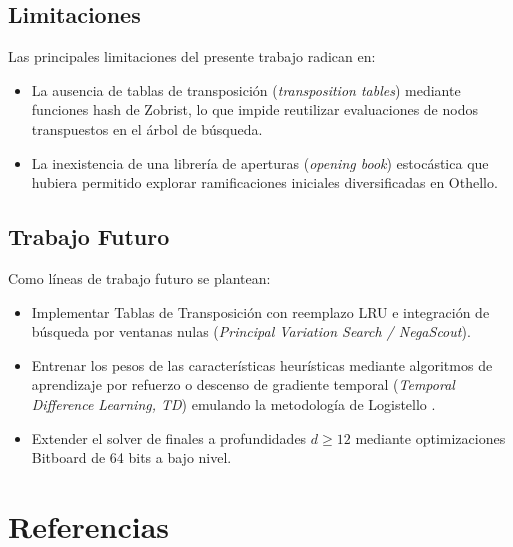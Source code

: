 \documentclass[10pt,a4paper]{article}
\begin{document}
\subsection{Limitaciones}
Las principales limitaciones del presente trabajo radican en:
\begin{itemize}
    \item La ausencia de tablas de transposición (\textit{transposition tables}) mediante funciones hash de Zobrist, lo que impide reutilizar evaluaciones de nodos transpuestos en el árbol de búsqueda.
    \item La inexistencia de una librería de aperturas (\textit{opening book}) estocástica que hubiera permitido explorar ramificaciones iniciales diversificadas en Othello.
\end{itemize}

\subsection{Trabajo Futuro}
Como líneas de trabajo futuro se plantean:
\begin{itemize}
    \item Implementar Tablas de Transposición con reemplazo LRU e integración de búsqueda por ventanas nulas (\textit{Principal Variation Search / NegaScout}).
    \item Entrenar los pesos de las características heurísticas mediante algoritmos de aprendizaje por refuerzo o descenso de gradiente temporal (\textit{Temporal Difference Learning, TD}) emulando la metodología de Logistello \cite{buro1997logistello}.
    \item Extender el solver de finales a profundidades $d \ge 12$ mediante optimizaciones Bitboard de 64 bits a bajo nivel.
\end{itemize}

\section*{Referencias}


\end{document}
